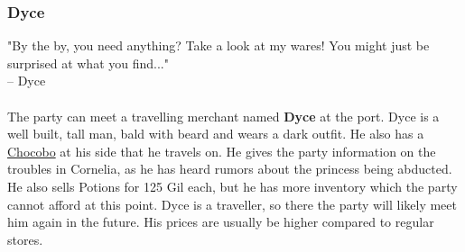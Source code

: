\vfill

\subsubsection*{Dyce}
"By the by, you need anything? Take a look at my wares! You might just be surprised at what you find..."\\
\indent-- Dyce \\\\
The party can meet a travelling merchant named \textbf{Dyce} at the port.
Dyce is a well built, tall man, bald with beard and wears a dark outfit.
He also has a \hyperlink{chocobo}{Chocobo} at his side that he travels on.
He gives the party information on the troubles in Cornelia, as he has heard rumors about the princess being abducted.
He also sells Potions for 125 Gil each, but he has more inventory which the party cannot afford at this point.
Dyce is a traveller, so there the party will likely meet him again in the future.
His prices are usually be higher compared to regular stores.

